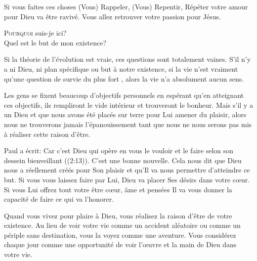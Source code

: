 Si vous faites ces choses
 \ocadr (Vous) Rappeler, (Vous) Repentir, Répéter \fcadr{}
 votre amour pour Dieu va être ravivé.
 Vous allez retrouver votre passion pour Jésus. 

\dvrule






\lettrine{P}{ourquoi} suis-je ici?\\
 Quel est le but de mon existence?

Si la théorie de l'évolution est vraie, ces questions sont totalement vaines.
 S'il n'y a ni Dieu, ni plan spécifique ou but à notre existence,
 si la vie n'est vraiment qu'une question de \Og survie du plus fort \Fg{},
 alors la vie n'a absolument aucun sens. 

Les gens se fixent beaucoup d'objectifs personnels en espérant
 qu'en atteignant ces objectifs, ils rempliront le vide intérieur
 et trouveront le bonheur. Mais s'il y a un Dieu et que nous avons
 été placés sur terre pour Lui amener du plaisir,
 alors nous ne trouverons jamais l'épanouissement
 tant que nous ne nous serons pas mis à réaliser cette raison d'être. 


Paul a écrit: 
 \Og Car c'est Dieu qui opère en vous le vouloir et le faire
 selon son dessein bienveillant \Fg{} ((2:13)).
 C'est une bonne nouvelle. Cela nous dit que Dieu nous a réellement
 créés pour Son plaisir \ocadr et qu'Il va nous permettre d'atteindre ce but.
 Si vous vous laissez faire par Lui, Dieu va placer Ses désirs
 dans votre c\oe{}ur. Si vous Lui offrez tout votre être
 \ocadr c\oe{}ur, âme et pensées \fcadr{} Il va vous donner la capacité
 de faire ce qui va l'honorer. 

Quand vous vivez pour plaire à Dieu, vous réalisez la raison d'être
 de votre existence. Au lieu de voir votre vie comme un accident aléatoire
 ou comme un périple sans destination, vous la voyez comme une aventure.
 Vous considérez chaque jour comme une opportunité de voir l'\oe{}uvre
 et la main de Dieu dans votre vie. 

